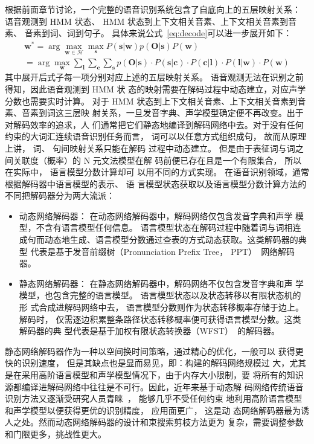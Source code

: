 根据前面章节讨论，一个完整的语音识别系统包含了自底向上的五层映射关系：
语音观测到 HMM 状态、 HMM 状态到上下文相关音素、上下文相关音素到音素、
音素到词、词到句子。
具体来说公式~\ref{eq:decode}可以进一步展开如下：
\begin{equation}
 \begin{split}
\mathbf{w}^* = \arg \max_{\mathbf{w} \in \mathcal{H}} \max_{\mathbf{s}} P(\mathbf{s}|\mathbf{w})p(\mathbf{O}|\mathbf{s})P(\mathbf{w}) \\
= \arg \max_{\mathbf{w}} \sum_{\mathbf{l}} \sum_{\mathbf{c}} \sum_{\mathbf{s}}
p(\mathbf{O}|\mathbf{s}) \cdot
P(\mathbf{s}|\mathbf{c})\cdot P(\mathbf{c}|\mathbf{l})\cdot P(\mathbf{l}|\mathbf{w}) \cdot 
P(\mathbf{w})
 \end{split}
\end{equation}
其中展开后式子每一项分别对应上述的五层映射关系。
语音观测无法在识别之前得知，因此语音观测到 HMM 状
态的映射需要在解码过程中动态建立，对应声学分数也需要实时计算。
对于 HMM 状态到上下文相关音素、上下文相关音素到音素、音素到词这三层映
射关系，一旦发音字典、声学模型确定便不再改变。出于对解码效率的追求，人
们通常把它们静态地编译到解码网络中去。对于没有任何约束的大词汇连续语音识别任务而言，
词可以以任意方式组织成句， 故而从原理上讲， 词、 句间映射关系只能在解码
过程中动态建立。 但是由于表征词与词之间关联度（概率）的 N 元文法模型在解
码前便已存在且是一个有限集合， 所以在实际中， 语言模型分数计算却可
以用不同的方式实现。 在语音识别领域，通常根据解码器中语言模型的表示、 语
言模型状态获取以及语言模型分数计算方法的不同把解码器分为两大流派：
\begin{itemize}
\item 动态网络解码器： 在动态网络解码器中，解码网络仅包含发音字典和声学
模型，不含有语言模型任何信息。 语言模型状态在解码过程中随着词与词相连
成句而动态地生成、语言模型分数通过查表的方式动态获取。这类解码器的典型
代表是基于发音前缀树（Pronunciation Prefix Tree， PPT）~\cite{woodland1994large}网络解码器。
\item 静态网络解码器： 在静态网络解码器中，解码网络不仅包含发音字典和声
学模型，也包含完整的语言模型。 语言模型状态以及状态转移以有限状态机的形
式合成进解码网络中去， 语言模型分数则作为状态转移概率存储于边上。解码时，
仅需逐边积累整条路径状态转移概率便可获得语言模型分数。这类解码器的典
型代表是基于加权有限状态转换器（WFST）~\cite{mohri2002weighted}的解码器。
\end{itemize}

静态网络解码器作为一种以空间换时间策略，通过精心的优化，一般可以
获得更快的识别速度， 但是其缺点也是显而易见，即：构建的解码网络规模过
大，尤其是在采用高阶语言模型和声学模型情况下，由于内存大小限制，要
将所有的知识源都编译进解码网络中往往是不可行。因此，近年来基于动态解
码网络传统语音识别方法又逐渐受研究人员青睐~\cite{soltau2009dynamic,rybach2011comparative}， 能够几乎不受任何约束
地利用高阶语言模型和声学模型以便获得更优的识别精度， 应用面更广， 这是动
态网络解码器最为诱人之处。然而动态网络解码器的设计和束搜索剪枝方法更为
复杂，需要调整参数和门限更多，挑战性更大。 

